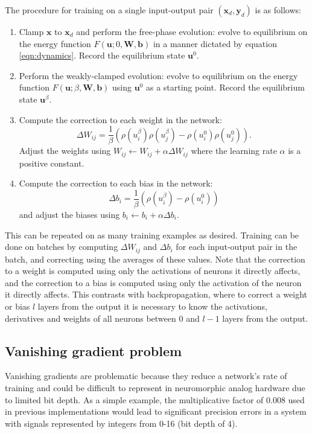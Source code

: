 \documentclass[utf8]{frontiersSCNS}
\newcommand{\mtx}[1]{\bm{#1}}
\begin{document}
The procedure for training on a single input-output pair $(\mtx{x}_d,\mtx{y}_d)$ is as follows:
\begin{enumerate}
\item Clamp $\mtx{x}$ to $\mtx{x}_d$ and perform the free-phase evolution: evolve to equilibrium on the energy function $F(\mtx{u}; 0, \mtx{W}, \mtx{b})$ in a manner dictated by equation \ref{eqn:dynamics}. Record the equilibrium state $\mtx{u}^0$.
\item Perform the weakly-clamped evolution: evolve to equilibrium on the energy function $F(\mtx{u}; \beta, \mtx{W}, \mtx{b})$ using $\mtx{u}^0$ as a starting point. Record the equilibrium state $\mtx{u}^{\beta}$.
\item Compute the correction to each weight in the network: 
\begin{equation}
\Delta W_{ij}=\frac{1}{\beta}(\rho(u_i^\beta)\rho(u_j^\beta)-\rho(u_i^0)\rho(u_j^0)). \label{eqn:weight_correction}
\end{equation}
Adjust the weights using $W_{ij}\leftarrow W_{ij}+\alpha\Delta W_{ij}$ where the learning rate $\alpha$ is a positive constant.
\item Compute the correction to each bias in the network:
\begin{equation}
\Delta b_i=\frac{1}{\beta}(\rho(u_i^{\beta})-\rho(u_i^0)) \label{eqn:bias_correction}
\end{equation}
and adjust the biases using $b_i\leftarrow b_i+\alpha\Delta b_i$.
\end{enumerate}
This can be repeated on as many training examples as desired. Training can be done on batches by computing $\Delta W_{ij}$ and $\Delta b_i$ for each input-output pair in the batch, and correcting using the averages of these values. Note that the correction to a weight is computed using only the activations of neurons it directly affects, and the correction to a bias is computed using only the activation of the neuron it directly affects. This contrasts with backpropagation, where to correct a weight or bias $l$ layers from the output it is necessary to know the activations, derivatives and weights of all neurons between $0$ and $l-1$ layers from the output.

\subsection{Vanishing gradient problem}
\label{sec:vangrad}

Vanishing gradients are problematic because they reduce a network's rate of training and could be difficult to represent in neuromorphic analog hardware due to limited bit depth. As a simple example, the multiplicative factor of 0.008 used in previous implementations would lead to significant precision errors in a system with signals represented by integers from 0-16 (bit depth of 4).
\end{document}
